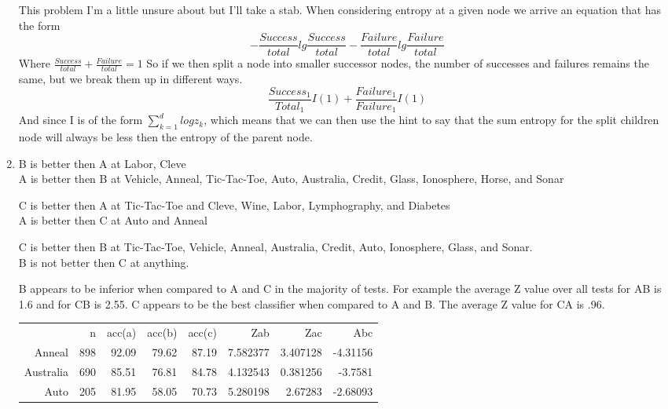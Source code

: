 \documentclass[11pt,fleqn]{article}
\begin{document}
\begin{enumerate}
This problem I'm a little unsure about but I'll take a stab. When considering entropy at a given node we arrive an equation that has the form 
\[
-\frac{Success}{total}lg\frac{Success}{total} - \frac{Failure}{total}lg\frac{Failure}{total}
\]
Where $\frac{Success}{total} + \frac{Failure}{total} = 1$
So if we then split a node into smaller successor nodes, the number of successes and failures remains the same, but we break them up in different ways. 
\[
\frac{Success_{1}}{Total_{1}}I(1) + \frac{Failure_{1}}{Failure_{1}}I(1)
\]  
And since I is of the form $\sum_{k=1}^{d} log z_{k}$, which means that we can then use the hint to say that the sum entropy for the split children node will always be less then the entropy of the parent node.  

\item %
B is better then A at Labor, Cleve \\
A is better then B at Vehicle, Anneal, Tic-Tac-Toe, Auto, Australia, Credit, Glass, Ionosphere, Horse, and Sonar

C is better then A at Tic-Tac-Toe and Cleve, Wine, Labor, Lymphography, and Diabetes \\
A is better then C at Auto and Anneal

C is better then B at Tic-Tac-Toe, Vehicle, Anneal, Australia, Credit, Auto, Ionosphere, Glass, and Sonar. \\
B is not better then C at anything. 

B appears to be inferior when compared to A and C in the majority of tests. For example the average Z value over all tests for AB is 1.6 and for CB is 2.55. 
C appears to be the best classifier when compared to A and B. The average Z value for CA is .96. 

\begin{tabular}{rrrrrrrr}

           &          n &     acc(a) &     acc(b) &       acc(c) &        Zab &        Zac &        Abc \\

    Anneal &        898 &      92.09 &      79.62 &      87.19 &   7.582377 &   3.407128 &   -4.31156 \\

 Australia &        690 &      85.51 &      76.81 &      84.78 &   4.132543 &   0.381256 &    -3.7581 \\

      Auto &        205 &      81.95 &      58.05 &      70.73 &   5.280198 &    2.67283 &   -2.68093 \\


\end{tabular}
\end{enumerate}
\end{document}
